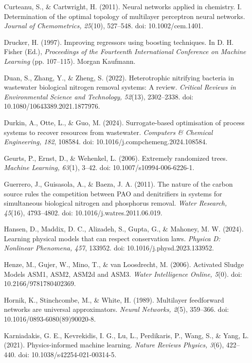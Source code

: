 \documentclass[a4paper,fleqn]{cas-sc}
\begin{document}
\noindent Curteanu, S., \& Cartwright, H. (2011). Neural networks applied in chemistry. I. Determination of the optimal topology of multilayer perceptron neural networks. \textit{Journal of Chemometrics, 25}(10), 527--548. doi: 10.1002/cem.1401.

\noindent Drucker, H. (1997). Improving regressors using boosting techniques. In D. H. Fisher (Ed.), \textit{Proceedings of the Fourteenth International Conference on Machine Learning} (pp. 107--115). Morgan Kaufmann.

\noindent Duan, S., Zhang, Y., \& Zheng, S. (2022). Heterotrophic nitrifying bacteria in wastewater biological nitrogen removal systems: A review. \textit{Critical Reviews in Environmental Science and Technology, 52}(13), 2302--2338. doi: 10.1080/10643389.2021.1877976.

\noindent Durkin, A., Otte, L., \& Guo, M. (2024). Surrogate-based optimisation of process systems to recover resources from wastewater. \textit{Computers \& Chemical Engineering, 182}, 108584. doi: 10.1016/j.compchemeng.2024.108584.

\noindent Geurts, P., Ernst, D., \& Wehenkel, L. (2006). Extremely randomized trees. \textit{Machine Learning, 63}(1), 3--42. doi: 10.1007/s10994-006-6226-1.

\noindent Guerrero, J., Guisasola, A., \& Baeza, J. A. (2011). The nature of the carbon source rules the competition between PAO and denitrifiers in systems for simultaneous biological nitrogen and phosphorus removal. \textit{Water Research, 45}(16), 4793--4802. doi: 10.1016/j.watres.2011.06.019.

\noindent Hansen, D., Maddix, D. C., Alizadeh, S., Gupta, G., \& Mahoney, M. W. (2024). Learning physical models that can respect conservation laws. \textit{Physica D: Nonlinear Phenomena, 457}, 133952. doi: 10.1016/j.physd.2023.133952.

\noindent Henze, M., Gujer, W., Mino, T., \& van Loosdrecht, M. (2006). Activated Sludge Models ASM1, ASM2, ASM2d and ASM3. \textit{Water Intelligence Online, 5}(0). doi: 10.2166/9781780402369.

\noindent Hornik, K., Stinchcombe, M., \& White, H. (1989). Multilayer feedforward networks are universal approximators. \textit{Neural Networks, 2}(5), 359--366. doi: 10.1016/0893-6080(89)90020-8.

\noindent Karniadakis, G. E., Kevrekidis, I. G., Lu, L., Perdikaris, P., Wang, S., \& Yang, L. (2021). Physics-informed machine learning. \textit{Nature Reviews Physics, 3}(6), 422--440. doi: 10.1038/s42254-021-00314-5.
\end{document}
